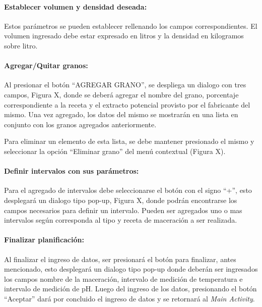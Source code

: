                 \paragraph{Establecer volumen y densidad deseada:}
                Estos parámetros se pueden establecer rellenando los campos correspondientes. El volumen ingresado debe estar expresado en litros y la densidad en kilogramos sobre litro.
                
                \paragraph{Agregar/Quitar granos:}
                Al presionar el botón ``AGREGAR GRANO'', se despliega un dialogo con tres campos, Figura X,  donde se deberá agregar el nombre del grano, porcentaje correspondiente a la receta y el extracto potencial provisto por el fabricante del mismo. Una vez agregado, los datos del mismo se mostrarán en una lista en conjunto con los granos agregados anteriormente.
                \par Para eliminar un elemento de esta lista, se debe mantener presionado el mismo y seleccionar la opción ``Eliminar grano'' del menú contextual (Figura X).
                
                \paragraph{Definir intervalos con sus parámetros:}
                Para el agregado de intervalos debe seleccionarse el botón con el signo ``+'', esto desplegará un dialogo tipo pop-up, Figura X, donde podrán encontrarse los campos necesarios para definir un intervalo. Pueden ser agregados uno o mas intervalos según corresponda al tipo y receta de maceración a ser realizada.
                
                \paragraph{Finalizar planificación:}
                Al finalizar el ingreso de datos, ser presionará el botón para finalizar, antes mencionado, esto desplegará un dialogo tipo pop-up donde deberán ser ingresados los campos nombre de la maceración, intervalo de medición de temperatura e intervalo de medición de pH. Luego del ingreso de los datos, presionando el botón ``Aceptar'' dará por concluido el ingreso de datos y se retornará al \textit{Main Activity}.
                
